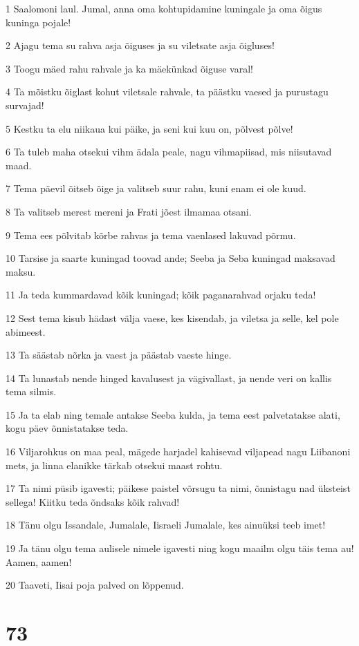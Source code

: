 \par 1 Saalomoni laul. Jumal, anna oma kohtupidamine kuningale ja oma õigus kuninga pojale!
\par 2 Ajagu tema su rahva asja õiguses ja su viletsate asja õigluses!
\par 3 Toogu mäed rahu rahvale ja ka mäekünkad õiguse varal!
\par 4 Ta mõistku õiglast kohut viletsale rahvale, ta päästku vaesed ja purustagu survajad!
\par 5 Kestku ta elu niikaua kui päike, ja seni kui kuu on, põlvest põlve!
\par 6 Ta tuleb maha otsekui vihm ädala peale, nagu vihmapiisad, mis niisutavad maad.
\par 7 Tema päevil õitseb õige ja valitseb suur rahu, kuni enam ei ole kuud.
\par 8 Ta valitseb merest mereni ja Frati jõest ilmamaa otsani.
\par 9 Tema ees põlvitab kõrbe rahvas ja tema vaenlased lakuvad põrmu.
\par 10 Tarsise ja saarte kuningad toovad ande; Seeba ja Seba kuningad maksavad maksu.
\par 11 Ja teda kummardavad kõik kuningad; kõik paganarahvad orjaku teda!
\par 12 Sest tema kisub hädast välja vaese, kes kisendab, ja viletsa ja selle, kel pole abimeest.
\par 13 Ta säästab nõrka ja vaest ja päästab vaeste hinge.
\par 14 Ta lunastab nende hinged kavalusest ja vägivallast, ja nende veri on kallis tema silmis.
\par 15 Ja ta elab ning temale antakse Seeba kulda, ja tema eest palvetatakse alati, kogu päev õnnistatakse teda.
\par 16 Viljarohkus on maa peal, mägede harjadel kahisevad viljapead nagu Liibanoni mets, ja linna elanikke tärkab otsekui maast rohtu.
\par 17 Ta nimi püsib igavesti; päikese paistel võrsugu ta nimi, õnnistagu nad üksteist sellega! Kiitku teda õndsaks kõik rahvad!
\par 18 Tänu olgu Issandale, Jumalale, Iisraeli Jumalale, kes ainuüksi teeb imet!
\par 19 Ja tänu olgu tema aulisele nimele igavesti ning kogu maailm olgu täis tema au! Aamen, aamen!
\par 20 Taaveti, Iisai poja palved on lõppenud.

\chapter{73}


